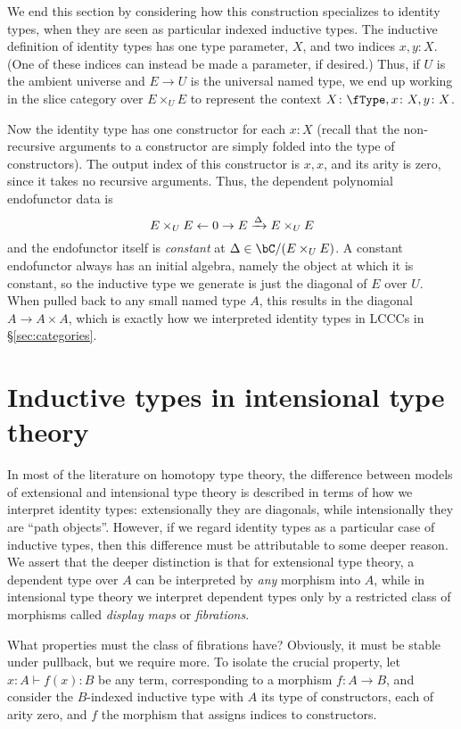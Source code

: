 \documentclass{amsart}
\begin{document}
We end this section by considering how this construction specializes to identity types, when they are seen as particular indexed inductive types.
The inductive definition of identity types has one type parameter, $X$, and two indices $x,y\colon X$.
(One of these indices can instead be made a parameter, if desired.)
Thus, if $U$ is the ambient universe and $E\to U$ is the universal named type, we end up working in the slice category over $E\times_U E$ to represent the context $X\colon \fType, x\colon X, y\colon X$.

Now the identity type has one constructor for each $x\colon X$ (recall that the non-recursive arguments to a constructor are simply folded into the type of constructors).
The output index of this constructor is $x,x$, and its arity is zero, since it takes no recursive arguments.
Thus, the dependent polynomial endofunctor data is
\[ E\times_U E \leftarrow 0 \to E \xrightarrow{\Delta} E\times_U E \]
and the endofunctor itself is \emph{constant} at $\Delta \in \bC/(E\times_U E)$.
A constant endofunctor always has an initial algebra, namely the object at which it is constant, so the inductive type we generate is just the diagonal of $E$ over $U$.
When pulled back to any small named type $A$, this results in the diagonal $A\to A\times A$, which is exactly how we interpreted identity types in LCCCs in \S\ref{sec:categories}.


\section{Inductive types in intensional type theory}
\label{sec:inductive-int}

In most of the literature on homotopy type theory, the difference between models of extensional and intensional type theory is described in terms of how we interpret identity types: extensionally they are diagonals, while intensionally they are ``path objects''.
However, if we regard identity types as a particular case of inductive types, then this difference must be attributable to some deeper reason.
We assert that the deeper distinction is that for extensional type theory, a dependent type over $A$ can be interpreted by \emph{any} morphism into $A$, while in intensional type theory we interpret dependent types only by a restricted class of morphisms called \emph{display maps} or \emph{fibrations}.

What properties must the class of fibrations have?
Obviously, it must be stable under pullback, but we require more.
To isolate the crucial property, let $x\colon A \vdash f(x)\colon B$ be any term, corresponding to a morphism $f\colon A\to B$, and consider the $B$-indexed inductive type with $A$ its type of constructors, each of arity zero, and $f$ the morphism that assigns indices to constructors.
\end{document}
